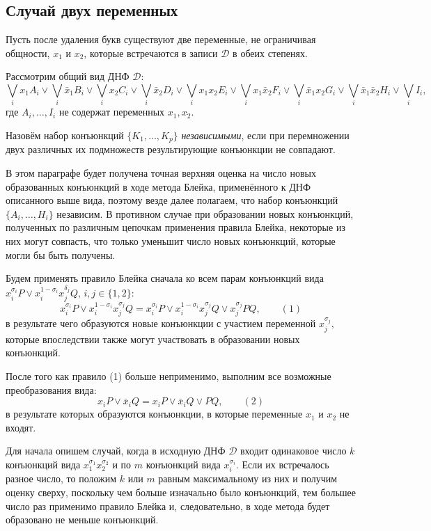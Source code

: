 \documentclass[12pt,a4paper,oneside,fleqn,leqno]{article}
\theoremstyle{definition}
\begin{document}
\subsection{Случай двух переменных}
			Пусть после удаления букв существуют две переменные, не ограничивая общности, $x_1$ и $x_2$, которые встречаются в записи $\mathcal{D}$ в обеих степенях.\par
			Рассмотрим общий вид ДНФ $\mathcal{D}$:
			$$
				\bigvee_ix_1A_i \vee \bigvee_i\bar{x}_1B_i \vee \bigvee_ix_2C_i \vee \bigvee_i\bar{x}_2D_i \vee \bigvee_ix_1x_2E_i \vee \bigvee_ix_1\bar{x}_2F_i \vee \bigvee_i\bar{x}_1x_2G_i \vee \bigvee_i\bar{x}_1\bar{x}_2H_i \vee \bigvee_iI_i,
			$$
			где $A_i, \ldots, I_i$ не содержат переменных $x_1, x_2.$\par
			Назовём набор конъюнкций $\{K_1, \ldots, K_p\}$ {\it независимыми}, если при перемножении двух различных их подмножеств результирующие конъюнкции не совпадают.\par
			В этом параграфе будет получена точная верхняя оценка на число новых образованных конъюнкций в ходе метода Блейка, применённого к ДНФ описанного выше вида, поэтому везде далее полагаем, что набор конъюнкций $\{A_i, \ldots, H_i\}$ независим. В противном случае при образовании новых конъюнкций, полученных по различным цепочкам применения правила Блейка, некоторые из них могут совпасть, что только уменьшит число новых конъюнкций, которые могли бы быть получены. \par
			Будем применять правило Блейка сначала ко всем парам конъюнкций вида\\$x_i^{\sigma_i}P \vee x_i^{1-\sigma_i}x_j^{\delta_j}Q,\, i,j\in\{1, 2\}$:
			$$
				x_i^{\sigma_i}P \vee x_i^{1-\sigma_i}x_j^{\sigma_j}Q = x_i^{\sigma_i}P \vee x_i^{1-\sigma_i}x_j^{\sigma_j}Q \vee x_j^{\sigma_j}PQ,\qquad(1)
			$$
			в результате чего образуются новые конъюнкции с участием переменной $x_j^{\sigma_j},$ которые впоследствии также могут участвовать в образовании новых конъюнкций.\par
			После того как правило (1) больше неприменимо, выполним все возможные преобразования вида:
			$$
				x_iP \vee \bar{x}_iQ = x_iP \vee \bar{x}_iQ \vee PQ,\qquad(2)
			$$
			в результате которых образуются конъюнкции, в которые переменные $x_1$ и $x_2$ не входят.\par
			Для начала опишем случай, когда в исходную ДНФ $\mathcal{D}$ входит одинаковое число $k$ конъюнкций вида $x_1^{\sigma_1}x_2^{\sigma_2}$ и по $m$ конъюнкций вида $x_i^{\sigma_i}$. Если их встречалось разное число, то положим $k$ или $m$ равным максимальному из них и получим оценку сверху, поскольку чем больше изначально было конъюнкций, тем большее число раз применимо правило Блейка и, следовательно, в ходе метода будет образовано не меньше конъюнкций.\par
\end{document}
